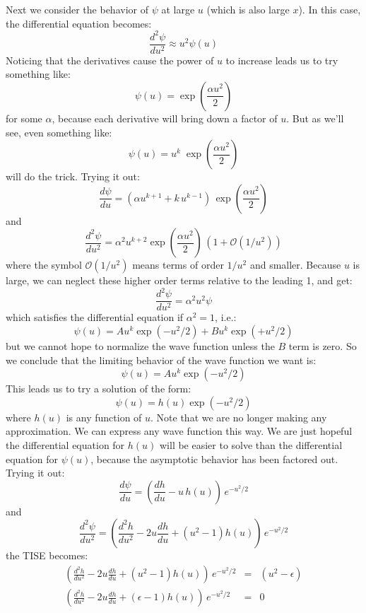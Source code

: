 \documentclass[12pt]{book}
\begin{document}
Next we consider the behavior of $\psi$ at large $u$ (which is also large $x$).  In this case, the differential equation becomes:
\begin{equation*}
\frac{d^2 \psi}{d u^2}  \approx u^2 \psi(u) 
\end{equation*}
Noticing that the derivatives cause the power of $u$ to increase leads us to try something like:
\begin{equation*}
\psi(u) = \exp\left(\frac{\alpha u^2}{2}\right)
\end{equation*}
for some $\alpha$, because each derivative will bring down a factor of $u$.  But as we'll see, even something like:
\begin{equation*}
\psi(u) = u^k \; \exp\left(\frac{\alpha u^2}{2}\right)
\end{equation*}
will do the trick.  Trying it out:
$$\frac{d \psi}{d u}  = \left(\alpha u^{k+1} + k\,u^{k-1}\right) \, \exp\left(\frac{\alpha u^2}{2}\right) $$
and
$$\frac{d^2 \psi}{d u^2}  = \alpha^2 u^{k+2} \exp\left(\frac{\alpha u^2}{2}\right) \, \left(1 + \mathcal{O}(1/u^2)\right)$$
where the symbol $\mathcal{O}(1/u^2)$ means terms of order $1/u^2$ and smaller.  Because $u$ is large, we can neglect these higher order terms relative to the leading 1, and get:
$$\frac{d^2 \psi}{d u^2}  = \alpha^2 u^2 \psi$$
which satisfies the differential equation if $\alpha^2 = 1$, i.e.:
$$\psi(u) = A u^k \exp(-u^2/2) + B u^k \exp(+u^2/2)$$
but we cannot hope to normalize the wave function unless the $B$ term is zero.  So we conclude that the limiting behavior of the wave function we want is:
$$\psi(u) = A u^k \exp(-u^2/2)$$
This leads us to try a solution of the form:
$$\psi(u) = h(u) \exp(-u^2/2)$$
where $h(u)$ is any function of $u$.  Note that we are no longer making any approximation.  We can express any wave function this way.  We are just hopeful the differential equation for $h(u)$ will be easier to solve than the differential equation for $\psi(u)$, because the asymptotic behavior has been factored out.  Trying it out:
$$\frac{d\psi}{du} = \left( \frac{dh}{du} - u\, h(u)\right) \, e^{-u^2/2}$$
and
$$\frac{d^2\psi}{du^2} = \left( \frac{d^2h}{du^2} - 2 u \frac{dh}{du} + (u^2-1)h(u) \right) \, e^{-u^2/2}$$
the TISE becomes:
\begin{eqnarray*}
\left( \frac{d^2h}{du^2} - 2 u \frac{dh}{du} + (u^2-1)h(u) \right) \, e^{-u^2/2} &=& (u^2-\epsilon)\\[7pt] 
\left( \frac{d^2h}{du^2} - 2 u \frac{dh}{du} + (\epsilon-1)h(u) \right) \, e^{-u^2/2} &=& 0\\
\end{eqnarray*}
\end{document}
